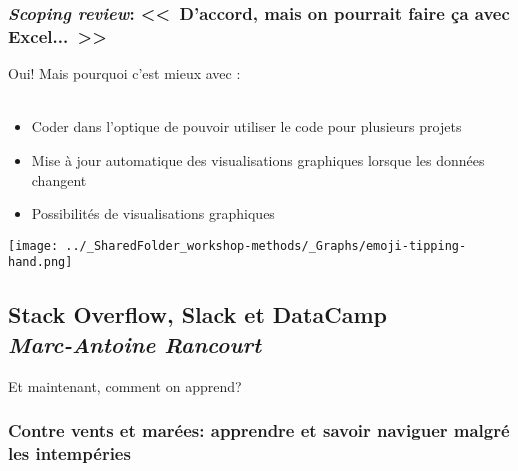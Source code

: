 \documentclass{beamer}
\begin{document}
    \begin{frame}
    
      \frametitle{\emph{Scoping review}: <<~D'accord, mais on pourrait faire ça avec Excel...~>>} \vspace{1.5cm}
      
    Oui! Mais pourquoi c'est mieux avec \R: \\~\\
    
        \begin{itemize}
          \item{Coder dans l'optique de pouvoir utiliser le code pour plusieurs projets}
          \item{Mise à jour automatique des visualisations graphiques lorsque les données changent}
          \item{Possibilités de visualisations graphiques}
        \end{itemize}
	
	  \begin{flushright}
     	    \texttt{[image: ../\_SharedFolder\_workshop-methods/\_Graphs/emoji-tipping-hand.png]}
    \end{flushright} 
          
    \end{frame}  
    

\subsection{Stack Overflow, Slack et DataCamp \\ \small\emph{Marc-Antoine Rancourt}}


\begin{frame}
     \begin{center}
          \Huge Et maintenant, comment on apprend?
      \end{center}
\end{frame}



    \begin{frame}
    
        \frametitle{Contre vents et marées: apprendre \R et savoir naviguer malgré les intempéries} \vspace{1cm}
    
    \end{frame}
    
\end{document}
